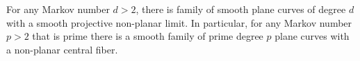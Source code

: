 \begin{Theorem}\label{thmA:nonplanarlimits}
For any Markov number $d >2$, there is family of smooth plane curves of degree $d$ with a smooth projective non-planar limit. In particular, for any Markov number $p>2$ that is prime there is a smooth family of prime degree $p$ plane curves with a non-planar central fiber.
\end{Theorem}
